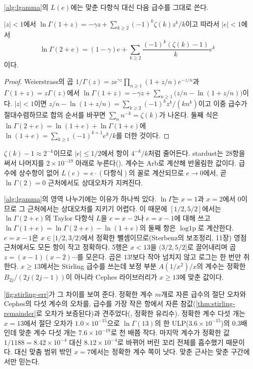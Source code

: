 \cref{alg:lgamma}의 $L(e)$에는 맞춘 다항식 대신 다음 급수를 그대로 쓴다.

\begin{proposition}
\label{prop:lgamma-taylor}
$|z|<1$에서 $\ln\Gamma(1+z)=-\gamma z+\sum_{k\ge2}(-1)^k\zeta(k)z^k/k$이고 따라서 $|e|<1$에서
\[
\ln\Gamma(2+e)=(1-\gamma)e+\sum_{k\ge2}\frac{(-1)^k(\zeta(k)-1)}{k}e^k
\]
이다.
\end{proposition}

\begin{proof}
Weierstrass의 곱 $1/\Gamma(z)=ze^{\gamma z}\prod_{n\ge1}(1+z/n)e^{-z/n}$과 $\Gamma(1+z)=z\Gamma(z)$에서 $\ln\Gamma(1+z)=-\gamma z+\sum_{n\ge1}\bigl(z/n-\ln(1+z/n)\bigr)$이다. $|z|<1$이면 $z/n-\ln(1+z/n)=\sum_{k\ge2}(-1)^kz^k/(kn^k)$이고 이중 급수가 절대수렴하므로 합의 순서를 바꾸면 $\sum_n n^{-k}=\zeta(k)$가 나온다. 둘째 식은 $\ln\Gamma(2+e)=\ln(1+e)+\ln\Gamma(1+e)$에 $\ln(1+e)=\sum_{k\ge1}(-1)^{k+1}e^k/k$를 더한 것이다.
\end{proof}

$\zeta(k)-1\approx2^{-k}$이므로 $|e|\le1/2$에서 항이 $4^{-k}/k$처럼 줄어든다. stardust는 $28$항을 써서 나머지를 $2\times10^{-19}$ 아래로 누른다(). 계수는 Arb로 계산해 반올림한 값이다. 급수에 상수항이 없어 $L(e)=e\cdot(\text{다항식})$의 꼴로 계산되므로 $e\to0$에서, 곧 $\ln\Gamma(2)=0$ 근처에서도 상대오차가 지켜진다.

\cref{alg:lgamma}의 영역 나누기에는 이유가 하나씩 있다. $\ln\Gamma$는 $x=1$과 $x=2$에서 $0$이므로 그 근처에서는 상대오차를 지키기 어렵다. 이 때문에 $[1/2,5/2]$에서는 $\ln\Gamma(2+e)$의 Taylor 다항식 $L$을 $e=x-2$나 $e=x-1$에 대해 쓰고 $\ln\Gamma(1+e)=\ln\Gamma(2+e)-\ln(1+e)$의 둘째 항은 $\operatorname{log1p}$로 계산한다. $e=x-1$은 $x\in[1/2,3/2)$에서 정확한 뺄셈이므로(Sterbenz의 보조정리, 11장) 영점 근처에서도 모든 항이 작고 정확하다. 5행은 $x<13$을 $(3/2,5/2]$로 끌어내리며 곱 $z=(x-1)(x-2)\cdots$를 모은다. 곱은 $13!$보다 작아 넘치지 않고 로그는 한 번만 취한다. $x\ge13$에서는 Stirling 급수를 쓰는데 보정 부분 $A(1/x^2)/x$의 계수는 정확한 $B_{2j}/(2j(2j-1))$이 아니라 Cephes 라이브러리가 $x\ge13$에 맞춘 값이다.

\cref{fig:stirling-err}가 그 차이를 보여 준다. 정확한 계수 $m$개로 자른 급수의 절단 오차와 Cephes의 다섯 계수의 오차를, 급수를 가장 작은 항에서 자른 참값(\cref{thm:stirling-remainder}로 오차가 보증된다)과 견주었다(, 정확한 유리수). 정확한 계수 다섯 개는 $x=13$에서 절단 오차가 $1.0\times10^{-15}$으로 $\ln\Gamma(13)$의 한 ULP($3.6\times10^{-15}$)의 $0.3$배인데 맞춘 계수 다섯 개는 $7.6\times10^{-19}$로 천 배쯤 작다. 마지막 계수가 정확한 값 $1/1188=8.42\times10^{-4}$ 대신 $8.12\times10^{-4}$로 바뀌어 버린 꼬리 전체를 흡수했기 때문이다. 대신 맞춤 범위 밖인 $x=7$에서는 정확한 계수 쪽이 낫다. 맞춘 근사는 맞춘 구간에서만 믿는다.

